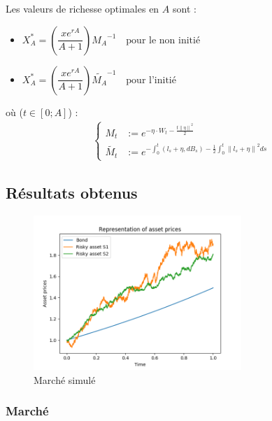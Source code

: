 \documentclass[french]{beamer}
\begin{document}
\begin{frame}
Les valeurs de richesse optimales en $A$ sont : 
\begin{itemize}
	\item $X_{A}^{*} = \left( \dfrac{x e^{rA}}{A + 1} \right) {M_{A}}^{-1} \quad \text{pour le non initié}$
	\item $X_{A}^{*} = \left( \dfrac{x e^{rA}}{A + 1} \right) {\tilde{M_{A}}}^{-1} \quad \text{pour l'initié}$
\end{itemize}
où ($t \in \left[0; A \right]$) :
\begin{displaymath}
	\begin{split}
	\left\lbrace
		\begin{array}{ll}
		M_{t} &:= e^{- \eta \cdot W_{t} - \frac{t {\| \eta \|}^{2}}{2}} \\
		\tilde{M_{t}} &:= e^{- \int_{0}^{t} \left( l_{s} + \eta, dB_{s} \right) - \frac{1}{2} \int_{0}^{t} {\| l_{s} + \eta \|}^{2} ds}
		\end{array}\right.	
	\end{split}
\end{displaymath}
\end{frame}


\subsection{Résultats obtenus}
\begin{frame}
\begin{figure}[H]
  \centering
    \includegraphics[width=0.7\textwidth]{images/market.png}
  \caption{Marché simulé}
\end{figure} 
\frametitle{Marché}
\end{frame}
\end{document}
